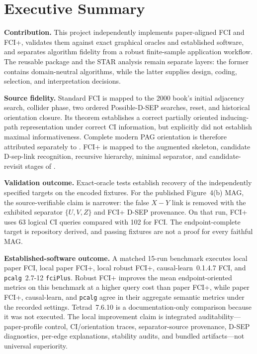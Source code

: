 \documentclass[11pt,a4paper,oneside]{report}
\newcommand{\code}[1]{\texttt{#1}}
\begin{document}
\chapter*{Executive Summary}
\small

\textbf{Contribution.} This project independently implements paper-aligned
FCI and FCI+, validates them against exact graphical oracles and established
software, and separates algorithm fidelity from a robust finite-sample
application workflow.  The reusable package and the STAR analysis remain
separate layers: the former contains domain-neutral algorithms, while the
latter supplies design, coding, selection, and interpretation decisions.

\textbf{Source fidelity.} Standard FCI is mapped to the 2000 book's initial
adjacency search, collider phase, two ordered Possible-D-SEP searches, reset,
and historical orientation closure.  Its theorem establishes a correct
partially oriented inducing-path representation under correct CI information,
but explicitly did not establish maximal informativeness.  Complete modern
PAG orientation is therefore attributed separately to
\citet{zhang2008completeness}.  FCI+ is mapped to the augmented skeleton,
candidate D-sep-link recognition, recursive hierarchy, minimal separator, and
candidate-revisit stages of \citet[Algorithm~2, p.~178]
{claassen2013learning}.

\textbf{Validation outcome.} Exact-oracle tests establish recovery of the
independently specified targets on the encoded fixtures.  For the published
Figure~4(b) MAG, the source-verifiable claim is narrower: the false
\(X-Y\) link is removed with the exhibited separator \(\{U,V,Z\}\) and
FCI+ D-SEP provenance.  On that run, FCI+ uses 63 logical CI queries compared
with 102 for FCI.  The endpoint-complete target is repository derived, and
passing fixtures are not a proof for every faithful MAG.

\textbf{Established-software outcome.} A matched 15-run benchmark executes
local paper FCI, local paper FCI+, local robust FCI+,
causal-learn~0.1.4.7 FCI, and \code{pcalg}~2.7-12
\code{fciPlus}.  Robust FCI+ improves the mean endpoint-oriented metrics on
this benchmark at a higher query cost than paper FCI+, while paper FCI+,
causal-learn, and \code{pcalg} agree in their aggregate semantic metrics under
the recorded settings.  Tetrad~7.6.10 is a documentation-only comparison
because it was not executed.  The local improvement claim is integrated
auditability---paper-profile control, CI/orientation traces, separator-source
provenance, D-SEP diagnostics, per-edge explanations, stability audits, and
bundled artifacts---not universal superiority.
\end{document}
